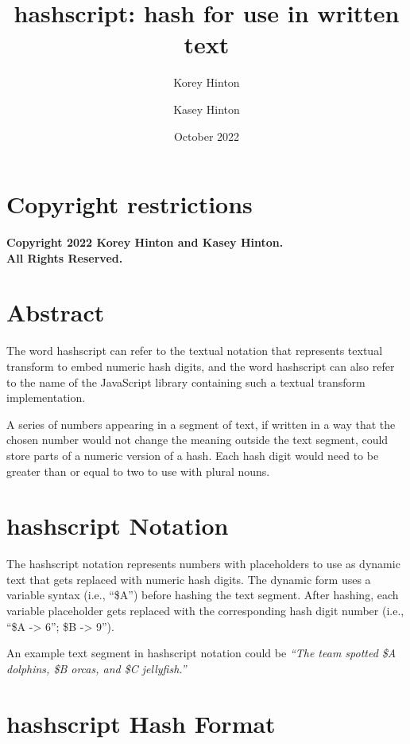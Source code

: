\documentclass[letterpaper,twocolumn]{article}%
\begin{document}
\title{\textbf{hashscript}: hash for use in written text}
\author{
Korey Hinton
\and
Kasey Hinton
}
\date{October 2022}

\maketitle

\clearpage

\section*{Copyright restrictions}
\textbf{Copyright 2022 Korey Hinton and Kasey Hinton. \\ All Rights Reserved.}

\clearpage

\tableofcontents 

\clearpage

\section{Abstract}
%
The word hashscript can refer to the textual notation
that represents textual transform to embed numeric hash digits,
and the word hashscript can also refer to the name
of the JavaScript library containing such a
textual transform implementation.

A series of numbers appearing in a segment of text,
if written in a way that the chosen number would not
change the meaning outside the text segment,
could store parts of a numeric version of a hash.
Each hash digit would need to be greater than or equal to two to use
with plural nouns.

\section{hashscript Notation}

The hashscript
notation represents numbers with placeholders
to use as dynamic text that gets replaced
with numeric hash digits. The dynamic form
uses a variable syntax (i.e., ``\$A'') before hashing
the text segment. After hashing, each variable
placeholder gets replaced with the corresponding hash
digit number (i.e., ``\$A -> 6''; \$B -> 9'').

An example text segment in hashscript notation
could be \textit{``The team spotted \$A dolphins, \$B orcas,
and \$C jellyfish.''}

\section{hashscript Hash Format}
 
\end{document}
